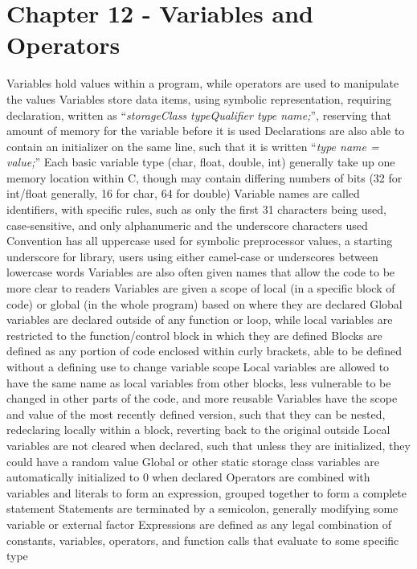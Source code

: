 \documentclass[11 pt, twoside]{article}
\newenvironment{outline*}
{
	\begin{outline}[enumerate]
	}
	{\end{outline}
}
\begin{document}
\section{Chapter 12 - Variables and Operators}
\begin{outline*}
\1 Variables hold values within a program, while operators are used to manipulate the values
\2 Variables store data items, using symbolic representation, requiring declaration, written as ``\textit{storageClass typeQualifier type name;}'', reserving that amount of memory for the variable before it is used
\2 Declarations are also able to contain an initializer on the same line, such that it is written ``\textit{type name = value;}''
\2 Each basic variable type (char, float, double, int) generally take up one memory location within C, though may contain differing numbers of bits (32 for int/float generally, 16 for char, 64 for double)
\2 Variable names are called identifiers, with specific rules, such as only the first 31 characters being used, case-sensitive, and only alphanumeric and the underscore characters used
\3 Convention has all uppercase used for symbolic preprocessor values, a starting underscore for library, users using either camel-case or underscores between lowercase words
\3 Variables are also often given names that allow the code to be more clear to readers
\2 Variables are given a scope of local (in a specific block of code) or global (in the whole program) based on where they are declared
\3 Global variables are declared outside of any function or loop, while local variables are restricted to the function/control block in which they are defined
\3 Blocks are defined as any portion of code enclosed within curly brackets, able to be defined without a defining use to change variable scope
\3 Local variables are allowed to have the same name as local variables from other blocks, less vulnerable to be changed in other parts of the code, and more reusable
\3 Variables have the scope and value of the most recently defined version, such that they can be nested, redeclaring locally within a block, reverting back to the original outside
\2 Local variables are not cleared when declared, such that unless they are initialized, they could have a random value
\3 Global or other static storage class variables are automatically initialized to 0 when declared
\1 Operators are combined with variables and literals to form an expression, grouped together to form a complete statement
\2 Statements are terminated by a semicolon, generally modifying some variable or external factor
\2 Expressions are defined as any legal combination of constants, variables, operators, and function calls that evaluate to some specific type

\end{outline*}
\end{document}
